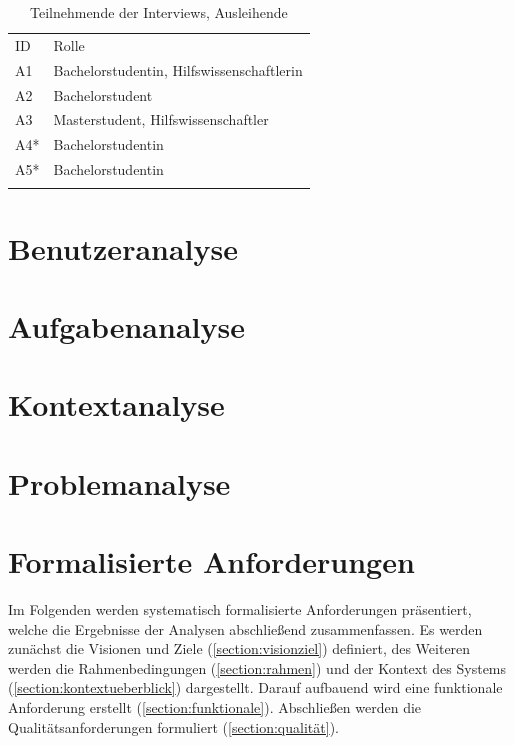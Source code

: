 \begin{table}[h]
    \centering 
    \caption{Teilnehmende der Interviews, Ausleihende}
    \begin{tabular}{ll}
        \arrayrulecolor{maincolor}\hline
        \sffamily\color{maincolor}ID & \sffamily\color{maincolor}Rolle \\
        \arrayrulecolor{maincolor}\hline
            A1  & Bachelorstudentin, Hilfswissenschaftlerin\\
            A2 &  Bachelorstudent\\
            A3  & Masterstudent, Hilfswissenschaftler \\
            A4*  & Bachelorstudentin \\
            A5*  & Bachelorstudentin \\
        \arrayrulecolor{maincolor}\hline
    \end{tabular}
    \label{table:a}
    \hfill
    
\end{table}

\section{Benutzeranalyse}
\label{section:benutzer}

\section{Aufgabenanalyse}
\label{section:aufgaben}

\section{Kontextanalyse}
\label{section:kontext}

\section{Problemanalyse}
\label{section:iststand}



\section{Formalisierte Anforderungen}
\label{section:anforderung}

Im Folgenden werden systematisch formalisierte Anforderungen präsentiert, welche die Ergebnisse der Analysen abschließend zusammenfassen.
Es werden zunächst die Visionen und Ziele (\ref{section:visionziel}) definiert, des Weiteren werden
die Rahmenbedingungen (\ref{section:rahmen}) und der Kontext des Systems
(\ref{section:kontextueberblick}) dargestellt. Darauf aufbauend wird eine funktionale Anforderung
erstellt (\ref{section:funktionale}). Abschließen werden die Qualitätsanforderungen formuliert
(\ref{section:qualität}).


